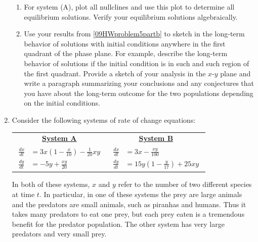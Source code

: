 \begin{enumerate}
\begin{enumerate}
\item	For system (A), plot all nullclines and use this plot to determine all equilibrium solutions. Verify your equilibrium solutions algebraically. \label{09HWproblem5partb}
\item	Use your results from \ref{09HWproblem5partb} to sketch in the long-term behavior of solutions with initial conditions anywhere in the first quadrant of the phase plane. For example, describe the long-term behavior of solutions if the initial condition is in such and such region of the first quadrant. Provide a sketch of your analysis in the $x$-$y$ plane and write a paragraph summarizing your conclusions and any conjectures that you have about the long-term outcome for the two populations depending on the initial conditions. \label{09HWproblem5partc} 

\end{enumerate}
\item Consider the following systems of rate of change equations:

\begin{center}
	\begin{tabular}{cc}
	\underline{\textbf{System A}}	&					\underline{\textbf{System B}}\\
$\displaystyle \begin{aligned} \frac{dx}{dt} &= 3x(1-\frac{x}{10})-\frac{1}{20}xy\\ \frac{dy}{dt} &=-5y+\frac{xy}{20} \end{aligned}$  	&			$\displaystyle \begin{aligned} \frac{dx}{dt} &= 3x-\frac{xy}{100}\\ \frac{dy}{dt} &=15y(1-\frac{y}{17})+25xy \end{aligned}$ 
	\end{tabular}
\end{center}

In both of these systems, $x$ and $y$ refer to the number of two different species at time $t$. In particular, in one of these systems the prey are large animals and the predators are small animals, such as piranhas and humans. Thus it takes many predators to eat one prey, but each prey eaten is a tremendous benefit for the predator population. The other system has very large predators and very small prey. \label{09HWproblem6}


\end{enumerate}
